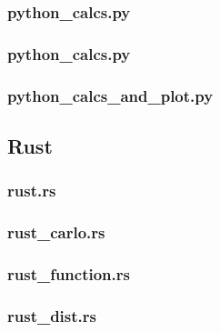 \subsubsection{python\rock_calcs\conversions.py}

\subsubsection{python\rock_calcs\main.py}

\subsubsection{python\rock_calcs\save_and_plot.py}

\subsection{Rust}
\subsubsection{rust\src\lib.rs}

\subsubsection{rust\src\monte_carlo.rs}

\subsubsection{rust\src\quantile_function.rs}

\subsubsection{rust\src\rock_dist.rs}

